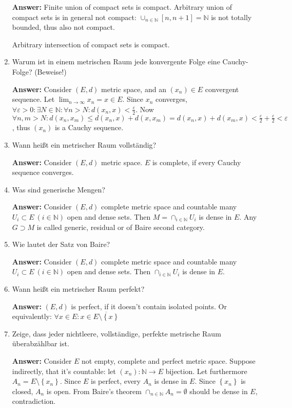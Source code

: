 \documentclass[11pt]{article}
\newcommand{\NN}[0]{\mathbb{N}}
\begin{document}
\begin{enumerate}
    \textbf{Answer:} Finite union of compact sets is compact. Arbitrary union of compact sets is in general not compact: $\cup_{n\in\NN}[n, n+1] = \NN$ is not totally bounded, thus also not compact.

    Arbitrary intersection of compact sets is compact.

    \item Warum ist in einem metrischen Raum jede konvergente Folge eine Cauchy-Folge? (Beweise!)

    \textbf{Answer:} Consider $(E, d)$ metric space, and an $(x_n) \in E$ convergent sequence. Let $\lim_{n \to \infty} x_n = x \in E$. Since $x_n$ converges, $\forall \varepsilon > 0\colon \exists N \in \NN\colon \forall n > N\colon d(x_n, x) < \frac{\varepsilon}{2}$. Now $\forall n, m > N\colon d(x_n, x_m) \le d(x_n, x) + d(x, x_m) = d(x_n, x) + d(x_m, x) < \frac{\varepsilon}{2} + \frac{\varepsilon}{2} < \varepsilon$, thus $(x_n)$ is a Cauchy sequence.

    \item Wann heißt ein metrischer Raum vollständig?

    \textbf{Answer:} Consider $(E, d)$ metric space. $E$ is complete, if every Cauchy sequence converges.

    \item Was sind generische Mengen?

    \textbf{Answer:} Consider $(E, d)$ complete metric space and countable many $U_i \subset E~(i \in \mathbb{N})$ open and dense sets. Then $M = \cap_{i \in \NN} U_i$ is dense in $E$. Any $G \supset M$ is called generic, residual or of  Baire second category.

    \item Wie lautet der Satz von Baire?

    \textbf{Answer:} Consider $(E, d)$ complete metric space and countable many $U_i \subset E~(i \in \mathbb{N})$ open and dense sets. Then $\cap_{i \in \NN} U_i$ is dense in $E$.

    \item Wann heißt ein metrischer Raum perfekt?

    \textbf{Answer:} $(E, d)$ is perfect, if it doesn't contain isolated points. Or equivalently: $\forall x \in E\colon x \in \overline{E \setminus \left\{x\right\}}$

    \item Zeige, dass jeder nichtleere, vollständige, perfekte metrische Raum überabzählbar ist.

    \textbf{Answer:} Consider $E$ not empty, complete and perfect metric space. Suppose indirectly, that it's countable: let $(x_n)\colon \NN \to E$ bijection. Let furthermore $A_n = E \setminus \left\{x_n\right\}$. Since $E$ is perfect, every $A_n$ is dense in $E$. Since $\left\{x_n\right\}$ is closed, $A_n$ is open. From Baire's theorem $\cap_{n\in\NN}A_n = \emptyset$ should be dense in $E$, contradiction.


\end{enumerate}
\end{document}
